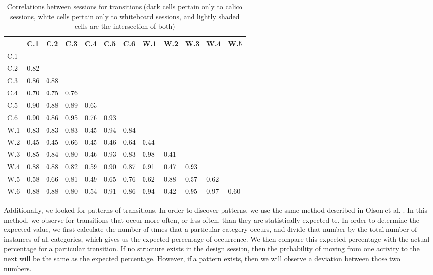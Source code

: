 \begin{table}
\centering
\caption{Correlations between sessions for transitions (dark cells pertain only to calico sessions, white cells pertain only to whiteboard sessions, and lightly shaded cells are the intersection of both)}
\begin{tabular}{ p{0.5cm}p{0.5cm}p{0.5cm}p{0.5cm}p{0.5cm}p{0.5cm}p{0.5cm}p{0.5cm}p{0.5cm}p{0.5cm}p{0.5cm}p{0.5cm}}
\toprule
&	C.1 &	C.2 &	C.3 &	C.4 &	C.5 &	C.6 &	W.1 &	W.2 &	W.3 &	W.4 &	W.5 \\
\midrule
C.1 	 & & & & & & & & & & & 								 \\
C.2 & 	0.82 & & & & & & & & & &								\\		
C.3 & 	0.86 &	0.88 & & & & & & & & & 							 \\		
C.4 & 	0.70 &	0.75 &	0.76 & & & & & & & &							\\	
C.5 & 	0.90 &	0.88 &	0.89 &	0.63 &	 & & & & & &						\\
C.6 & 	0.90 &	0.86 &	0.95 &	0.76 &	0.93 & & & & & &					\\	
W.1 &	0.83 &	0.83 &	0.83 &	0.45 &	0.94 &	0.84 & & & & &				\\	
W.2 &	0.45 &	0.45 &	0.66 &	0.45 &	0.46 &	0.64 &	0.44 & & & &				\\
W.3 &	0.85 &	0.84 &	0.80 &	0.46 &	0.93 &	0.83 &	0.98 &	0.41 & & &			\\
W.4 &	0.88 &	0.88 &	0.82 &	0.59 &	0.90 &	0.87 &	0.91 &	0.47 &	0.93 & &		\\
W.5 &	0.58 &	0.66 &	0.81 &	0.49 &	0.65 &	0.76 &	0.62 &	0.88 &	0.57 &	0.62 &		\\
W.6 &	0.88 &	0.88 &	0.80 &	0.54 &	0.91 &	0.86 &	0.94 &	0.42 &	0.95 &	0.97 &	0.60	\\
\bottomrule
\end{tabular}
\label{table:4}
\end{table}

Additionally, we looked for patterns of transitions. In order to discover patterns, we use the same method described in Olson et al. \citep{Olsona}. In this method, we observe for transitions that occur more often, or less often, than they are statistically expected to. In order to determine the expected value, we first calculate the number of times that a particular category occurs, and divide that number by the total number of instances of all categories, which gives us the expected percentage of occurrence. We then compare this expected percentage with the actual percentage for a particular transition. If no structure exists in the design session, then the probability of moving from one activity to the next will be the same as the expected percentage. However, if a pattern exists, then we will observe a deviation between those two numbers.

